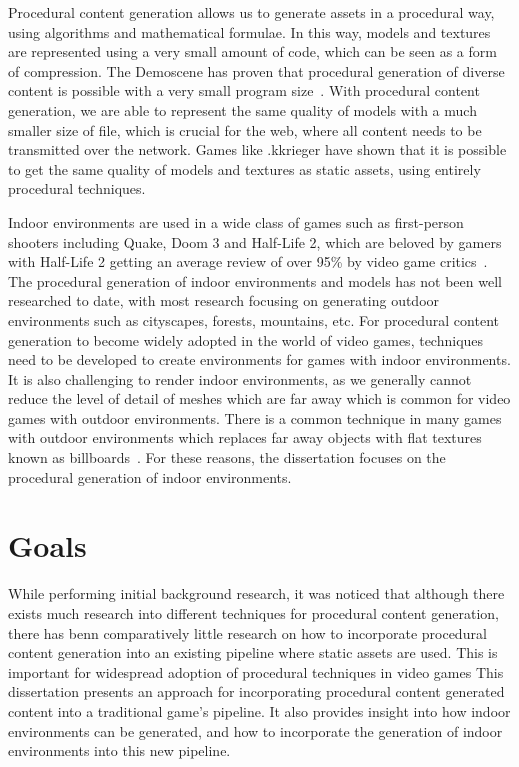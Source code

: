 Procedural content generation allows us to generate assets in a procedural way, using algorithms and mathematical formulae.
In this way, models and textures are represented using a very small amount of code, which can be seen as a form of compression.
The Demoscene has proven that procedural generation of diverse content is possible with a very small program size~\cite{web:demoscene4k}.
With procedural content generation, we are able to represent the same quality of models with a much smaller size of file, which is crucial for the web, where all content needs to be transmitted over the network.
Games like .kkrieger have shown that it is possible to get the same quality of models and textures as static assets, using entirely procedural techniques.

Indoor environments are used in a wide class of games such as first-person shooters including Quake, Doom 3 and Half-Life 2, which are beloved by gamers with Half-Life 2 getting an average review of over 95\% by video game critics~\cite{web:hl2gamerankings}.
The procedural generation of indoor environments and models has not been well researched to date, with most research focusing on generating outdoor environments such as cityscapes, forests, mountains, etc.
For procedural content generation to become widely adopted in the world of video games, techniques need to be developed to create environments for games with indoor environments.
It is also challenging to render indoor environments, as we generally cannot reduce the level of detail of meshes which are far away which is common for video games with outdoor environments.
There is a common technique in many games with outdoor environments which replaces far away objects with flat textures known as billboards~\cite{Decoret:2003:BCE:1201775.882326}.
For these reasons, the dissertation focuses on the procedural generation of indoor environments.

\section{Goals}
While performing initial background research, it was noticed that although there exists much research into different techniques for procedural content generation, there has benn comparatively little research on how to incorporate procedural content generation into an existing pipeline where static assets are used.
This is important for widespread adoption of procedural techniques in video games
This dissertation presents an approach for incorporating procedural content generated content into a traditional game's pipeline.
It also provides insight into how indoor environments can be generated, and how to incorporate the generation of indoor environments into this new pipeline.

